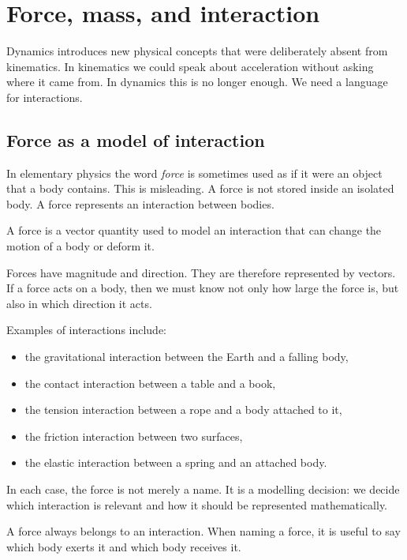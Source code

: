 \section{Force, mass, and interaction}

Dynamics introduces new physical concepts that were deliberately absent from kinematics. In kinematics we could speak about acceleration without asking where it came from. In dynamics this is no longer enough. We need a language for interactions.

\subsection{Force as a model of interaction}

In elementary physics the word \emph{force} is sometimes used as if it were an object that a body contains. This is misleading. A force is not stored inside an isolated body. A force represents an interaction between bodies.

\begin{definitionbox}
A force is a vector quantity used to model an interaction that can change the motion of a body or deform it.
\end{definitionbox}

Forces have magnitude and direction. They are therefore represented by vectors. If a force acts on a body, then we must know not only how large the force is, but also in which direction it acts.

Examples of interactions include:
\begin{itemize}
\item the gravitational interaction between the Earth and a falling body,
\item the contact interaction between a table and a book,
\item the tension interaction between a rope and a body attached to it,
\item the friction interaction between two surfaces,
\item the elastic interaction between a spring and an attached body.
\end{itemize}

In each case, the force is not merely a name. It is a modelling decision: we decide which interaction is relevant and how it should be represented mathematically.

\begin{remarkbox}
A force always belongs to an interaction. When naming a force, it is useful to say which body exerts it and which body receives it.
\end{remarkbox}

